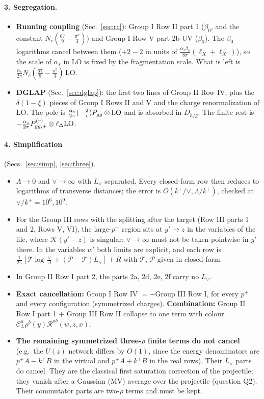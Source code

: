 \documentclass[10pt]{article}
\numberwithin{equation}{section}
\newcommand{\Lv}{L_{\vee}}
\newcommand{\CL}{\mathcal C_L}
\newcommand{\Rc}{\mathcal R}
\newcommand{\KK}{\mathcal K}
\begin{document}
\paragraph{3. Segregation.}
\begin{itemize}
\item \textbf{Running coupling} (Sec.~\ref{sec:rc}): Group I Row II part 1 ($\beta_0$, and the constant $N_c(\frac{67}{9}-\frac{\pi^2}{3})$) and Group I Row V part 2b UV ($\beta_0$). The $\beta_0$ logarithms cancel between them ($+2-2$ in units of $\frac{\alpha_s\beta_0}{8\pi}(\ell_X+\ell_{X'})$), so the scale of $\alpha_s$ in LO is fixed by the fragmentation scale. What is left is $\frac{\alpha_s}{2\pi}N_c(\frac{67}{9}-\frac{\pi^2}{3})\,$LO.
\item \textbf{DGLAP} (Sec.~\ref{sec:dglap}): the first two lines of Group II Row IV, plus the $\delta(1-\xi)$ pieces of Group I Rows II and V and the charge renormalization of LO. The pole is $\frac{\alpha_s}{2\pi}(-\frac2\epsilon)P_{gg}\otimes{\rm LO}$ and is absorbed in $D_{h/g}$. The finite rest is $-\frac{\alpha_s}{2\pi}P^{(r)}_{gg,+}\otimes\ell_\Delta{\rm LO}$.
\end{itemize}

\paragraph{4. Simplification} (Secs.~\ref{sec:simp}, \ref{sec:three}).
\begin{itemize}
\item $\Lambda\to0$ and $\vee\to\infty$ with $\Lv$ separated. Every closed-form row then reduces to logarithms of transverse distances; the error is $O(k^+/\vee,\Lambda/k^+)$, checked at $\vee/k^+=10^6,10^9$.
\item For the Group III rows with the splitting after the target (Row III parts 1 and 2, Rows V, VI), the large-$p^+$ region sits at $y'\to z$ in the variables of the file, where $\KK(y'-z)$ is singular; $\vee\to\infty$ must not be taken pointwise in $y'$ there. In the variables $w'$ both limits are explicit, and each row is $\frac1{2\pi}[\mathcal T\log\frac\vee\Lambda+(\mathcal P-\mathcal T)\Lv]+R$ with $\mathcal T$, $\mathcal P$ given in closed form.
\item In Group II Row I part 2, the parts 2a, 2d, 2e, 2f carry no $\Lv$.
\item \textbf{Exact cancellation:} Group I Row IV $=-$Group III Row I, for every $p^+$ and every configuration (symmetrized charges). \textbf{Combination:} Group II Row I part 1 + Group III Row II collapse to one term with colour $\CL^a\rho^b(y)\Rc^{ab}(w,z,x)$.
\item \textbf{The remaining symmetrized three-$\rho$ finite terms do not cancel} (e.g.\ the $U(z)$ network differs by $O(1)$, since the energy denominators are $p^+A-k^+B$ in the virtual and $p^+A+k^+B$ in the real rows). Their $\Lv$ parts do cancel. They are the classical first saturation correction of the projectile; they vanish after a Gaussian (MV) average over the projectile (question Q2). Their commutator parts are two-$\rho$ terms and must be kept.
\end{itemize}
\end{document}
